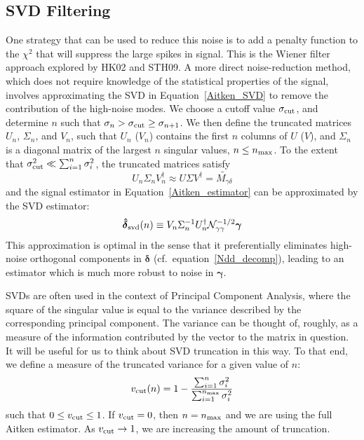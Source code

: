 \documentclass[twocolumn]{emulateapj}
\newcommand{\myvec}[1]{\boldsymbol{#1}}
\newcommand{\mymat}[1]{#1}
\begin{document}
\subsection{SVD Filtering}
\label{sing_val_formalism}
One strategy that can be used to reduce this noise is to add a penalty function
to the $\chi^2$ that will suppress the large spikes in signal.  This
is the Wiener filter approach explored by HK02 and STH09.
A more direct noise-reduction method, which does not require knowledge 
of the statistical properties of the signal, involves approximating 
the SVD in Equation~\ref{Aitken_SVD} to remove the contribution of the 
high-noise modes. We choose a cutoff value
$\sigma_{\rm cut}$, and determine $n$ such that 
$\sigma_n > \sigma_{\rm cut} \ge \sigma_{n+1}$.
We then define the truncated matrices 
$\mymat{U_n}$, $\mymat{\Sigma_n}$, and $\mymat{V_n}$,
such that $\mymat{U_n}$ ($\mymat{V_n}$) contains the first $n$ columns of 
$\mymat{U}$ ($\mymat{V}$),
and $\mymat{\Sigma}_n$ is a diagonal matrix of the largest $n$ singular 
values, $n \le n_{\rm max}$.
To the extent that $\sigma_{\rm cut}^2 \ll \sum_{i=1}^n\sigma_i^2$, 
the truncated matrices satisfy
\begin{equation}
  \mymat{U_n}\mymat{\Sigma_n}\mymat{V_n}^\dagger \approx 
  \mymat{U}\mymat{\Sigma}\mymat{V}^\dagger = \mymat{\widetilde{M_{\gamma\delta}}}
\end{equation}
and the signal estimator in Equation~\ref{Aitken_estimator} can be approximated
by the SVD estimator:
\begin{equation}
  \label{SVD_estimator}
  \myvec{\hat{\delta}}_{\rm svd}(n) \equiv 
  \mymat{V}_n \mymat{\Sigma}_n^{-1} 
  \mymat{U}_n^\dagger \mymat{\mathcal{N}_{\gamma\gamma}}^{-1/2} \myvec{\gamma}
\end{equation}
This approximation is optimal in the sense that it preferentially
eliminates high-noise orthogonal components in $\myvec{\delta}$ 
(cf.\ equation~\ref{Ndd_decomp}), leading to an estimator which is much
more robust to noise in $\myvec{\gamma}$.

SVDs are often used in the context of Principal Component Analysis, 
where the square of the singular value is equal to the variance described 
by the corresponding principal component.  The variance can be
thought of, roughly, as a measure of the information contributed by the
vector to the matrix in question.  It will be useful for
us to think about SVD truncation in this way.  To that end, 
we define a measure of the truncated variance for a given value of $n$:
\begin{equation}
  \label{v_cut}
  v_{\rm cut}(n) = 1 - \frac{\sum_{i=1}^n\sigma_i^2}
  {\sum_{i=1}^{n_{\rm max}}\sigma_i^2}
\end{equation}
such that $0\le v_{\rm cut}\le 1$.  If $v_{\rm cut} = 0$, then $n = n_{\rm max}$ and we are 
using the full Aitken estimator.  As $v_{\rm cut} \rightarrow 1$, we are increasing the amount
of truncation.
\end{document}

